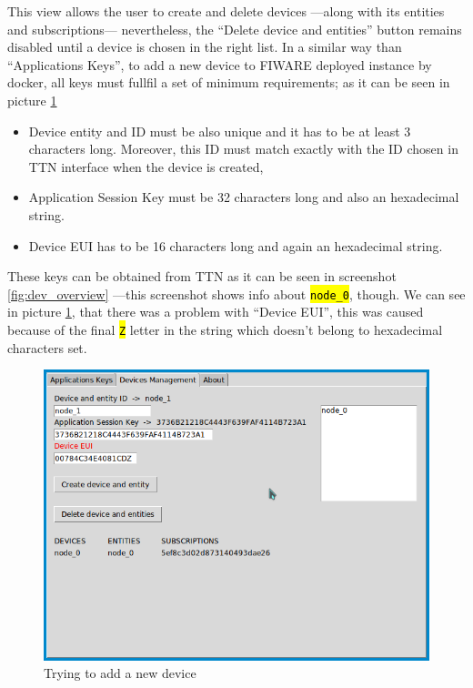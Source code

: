 \documentclass[11pt,a4paper,dvipsnames,twoside]{article}
\newcommand{\cmd}[1] {\hl{\texttt{#1}}}
\begin{document}
This view allows the user to create and delete devices ---along with its entities and subscriptions--- nevertheless, the \enquote{Delete device and entities} button remains disabled until a device is chosen in the right list. In a similar way than \enquote{Applications Keys}, to add a new device to FIWARE deployed instance by docker, all keys must fullfil a set of minimum requirements; as it can be seen in picture \ref{fig:adding_dev}

\begin{itemize}
  \item Device entity and ID must be also unique and it has to be at least 3 characters long. Moreover, this ID must match exactly with the ID chosen in TTN interface when the device is created,
  \item Application Session Key must be 32 characters long and also an hexadecimal string.
  \item Device EUI has to be 16 characters long and again an hexadecimal string.
\end{itemize}

These keys can be obtained from TTN as it can be seen in screenshot \ref{fig:dev_overview} ---this screenshot shows info about \cmd{node\_0}, though. We can see in picture \ref{fig:adding_dev}, that there was a problem with \enquote{Device EUI}, this was caused because of the final \cmd{Z} letter in the string which doesn't belong to hexadecimal characters set.

\begin{figure}[htp]
  \centering
  \includegraphics[width=.9\textwidth]{../pictures/GUI_add_device.png}
  \caption{Trying to add a new device}
  \label{fig:adding_dev}
\end{figure}
\end{document}
